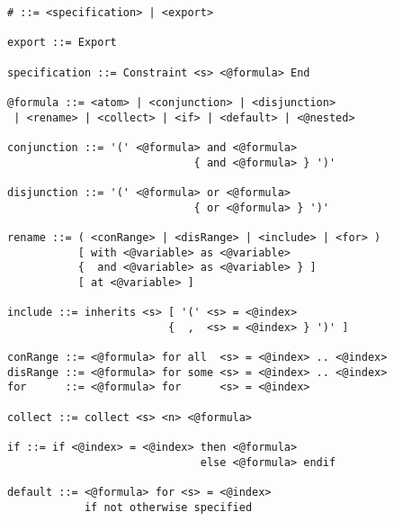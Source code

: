 \begin{figure}[h]
\begin{lstlisting}[language=BNF,basicstyle=\linespread{0.8}\ttfamily,
                   captionpos=t,caption=
   {Verbatim display of the grammar file that is used to generate the parser for
    IDL.
    The file is in a custom version of Backus–Naur form.
    In the parse tree, all expressions that start with ``{@}'' are
    automatically expanded.
    The character ``\#'' marks the top-level language construct.
    Any expression that does not ultimately become part of this construct
    constitutes a syntax error.\parfillskip=0pt}]
# ::= <specification> | <export>

export ::= Export

specification ::= Constraint <s> <@formula> End

@formula ::= <atom> | <conjunction> | <disjunction>
 | <rename> | <collect> | <if> | <default> | <@nested>

conjunction ::= '(' <@formula> and <@formula>
                             { and <@formula> } ')'

disjunction ::= '(' <@formula> or <@formula>
                             { or <@formula> } ')'

rename ::= ( <conRange> | <disRange> | <include> | <for> )
           [ with <@variable> as <@variable>
           {  and <@variable> as <@variable> } ]
           [ at <@variable> ]

include ::= inherits <s> [ '(' <s> = <@index>
                         {  ,  <s> = <@index> } ')' ]

conRange ::= <@formula> for all  <s> = <@index> .. <@index>
disRange ::= <@formula> for some <s> = <@index> .. <@index>
for      ::= <@formula> for      <s> = <@index>

collect ::= collect <s> <n> <@formula>

if ::= if <@index> = <@index> then <@formula>
                              else <@formula> endif

default ::= <@formula> for <s> = <@index>
            if not otherwise specified
\end{lstlisting}
\end{figure}
